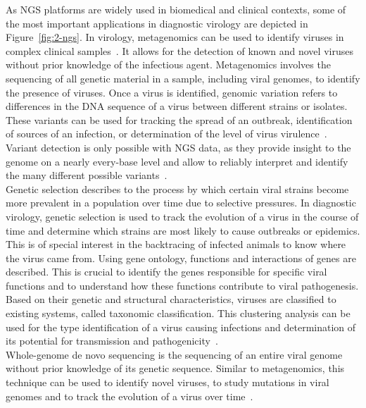 As NGS platforms are widely used in biomedical and clinical contexts, some of the most important applications in diagnostic virology are depicted in Figure~\ref{fig:2-ngs}. In virology, metagenomics can be used to identify viruses in complex clinical samples~\cite{chiu2019clinical}. It allows for the detection of known and novel viruses without prior knowledge of the infectious agent. Metagenomics involves the sequencing of all genetic material in a sample, including viral genomes, to identify the presence of viruses. Once a virus is identified, genomic variation refers to differences in the DNA sequence of a virus between different strains or isolates. These variants can be used for tracking the spread of an outbreak, identification of sources of an infection, or determination of the level of virus virulence~\cite{capobianchi2013next}. Variant detection is only possible with NGS data, as they provide insight to the genome on a nearly every-base level and allow to reliably interpret and identify the many different possible variants~\cite{koboldt2013next}. \\ 
Genetic selection describes to the process by which certain viral strains become more prevalent in a population over time due to selective pressures. In diagnostic virology, genetic selection is used to track the evolution of a virus in the course of time and determine which strains are most likely to cause outbreaks or epidemics. This is of special interest in the backtracing of infected animals to know where the virus came from. Using gene ontology, functions and interactions of genes are described. This is crucial to identify the genes responsible for specific viral functions and to understand how these functions contribute to viral pathogenesis. \\
Based on their genetic and structural characteristics, viruses are classified to existing systems, called taxonomic classification. This clustering analysis can be used for the type identification of a virus causing infections and determination of its potential for transmission and pathogenicity~\cite{dutilh2021perspective}.\\
Whole-genome de novo sequencing is the sequencing of an entire viral genome without prior knowledge of its genetic sequence. Similar to metagenomics, this technique can be used to identify novel viruses, to study mutations in viral genomes and to track the evolution of a virus over time~\cite{slatko2018overview}.

